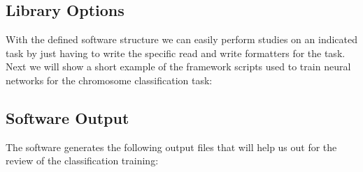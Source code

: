 \documentclass[a4paper,10pt,titlepage]{article}
\begin{document}
\subsection{Library Options}

\par With the defined software structure we can easily perform studies on an indicated task by just having to write the specific
read and write formatters for the task. Next we will show a short example of the framework scripts used to train neural networks 
for the chromosome classification task: 

\lstset{basicstyle=\footnotesize,language=Ruby}
\lstset{linewidth=500pt}
\lstset{numbers=left, stepnumber=1}
\lstset{frame=trBL,frameround=tttt}


\subsection{Software Output}

\par The software generates the following output files that will help us out for the review of the classification training:
\end{document}
